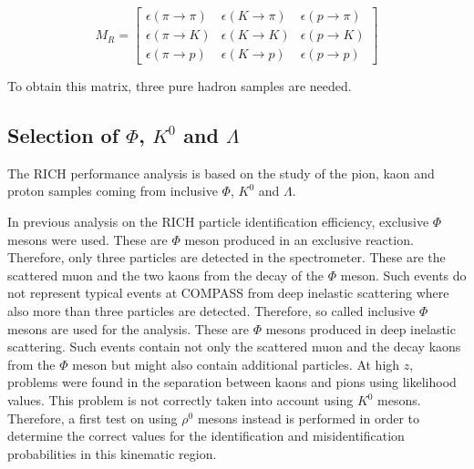 \begin{equation}
  M_R
  =
  \begin{bmatrix}
  \epsilon(\pi \rightarrow \pi) & \epsilon(K \rightarrow \pi) & \epsilon(p \rightarrow \pi)\\
  \epsilon(\pi \rightarrow K) & \epsilon(K \rightarrow K) & \epsilon(p \rightarrow K) \\
  \epsilon(\pi \rightarrow p) & \epsilon(K \rightarrow p) & \epsilon(p \rightarrow p)
  \end{bmatrix}
\end{equation}

To obtain this matrix, three pure hadron samples are needed.

\subsection{Selection of $\Phi$, $K^0$ and $\Lambda$}

The RICH performance analysis is based on the study of the pion, kaon and proton samples coming from inclusive $\Phi$, $K^0$ and $\Lambda$.

In previous analysis on the RICH particle identification efficiency, exclusive $\Phi$ mesons were used. These are $\Phi$ meson produced in an exclusive reaction.
Therefore, only three particles are detected in the spectrometer. These are the scattered muon and the two kaons from the decay of the $\Phi$ meson. Such events do not represent typical events at COMPASS from deep inelastic scattering where also more than three particles are detected. Therefore, so called inclusive $\Phi$ mesons are used for the analysis. These are $\Phi$ mesons produced in deep inelastic scattering. Such events contain not only the scattered muon and the decay kaons from the $\Phi$ meson but might also contain additional particles. At high $z$, problems were found in the separation between kaons and pions using likelihood values\cite{}. This problem is not correctly taken into account using $K^0$ mesons. Therefore, a first test on using $\rho^0$ mesons instead is performed in order to determine the correct values for the identification and misidentification probabilities in this kinematic region.

